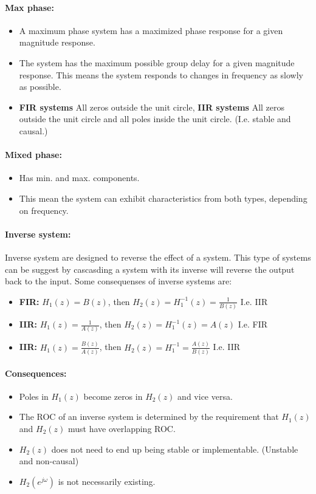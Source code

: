 \documentclass{article}
\begin{document}
\paragraph{Max phase:}
\begin{itemize}
    \item A maximum phase system has a maximized phase response for a given magnitude response.
    \item The system has the maximum possible group delay for a given magnitude response. This means the system responds to changes in frequency as slowly as possible.
    \item \textbf{FIR systems} All zeros outside the unit circle, \textbf{IIR systems} All zeros outside the unit circle and all poles inside the unit circle. (I.e. stable and causal.)
\end{itemize}

\paragraph{Mixed phase:}
\begin{itemize}
    \item Has min. and max. components.
    \item This mean the system can exhibit characteristics from both types, depending on frequency.
\end{itemize}

\paragraph{Inverse system:}
Inverse system are designed to reverse the effect of a system. This type of systems can be suggest by cascasding a system with its inverse will reverse the output back to the input.
 Some consequenses of inverse systems are:
\begin{itemize}
    \item \textbf{FIR:} $H_1(z) = B(z)$, then $H_2(z)=H_1^{-1}(z) = \frac{1}{B(z)}$ I.e. IIR
    \item \textbf{IIR:} $H_1(z) = \frac{1}{A(z)}$, then $H_2(z)=H_1^{-1}(z) = A(z)$ I.e. FIR 
    \item \textbf{IIR:} $H_1(z) = \frac{B(z)}{A(z)}$, then $H_2(z) = H_1^{-1} = \frac{A(z)}{B(z)}$ I.e. IIR
\end{itemize}

\paragraph{Consequences:}
\begin{itemize}
    \item Poles in $H_1(z)$ become zeros in $H_2(z)$ and vice versa.
    \item The ROC of an inverse system is determined by the requirement that $H_1(z)$ and $H_2(z)$ must have overlapping ROC.
    \item $H_2(z)$ does not need to end up being stable or implementable. (Unstable and non-causal)
    \item $H_2(e^{j\omega})$ is not necessarily existing.
\end{itemize} 
\end{document}
